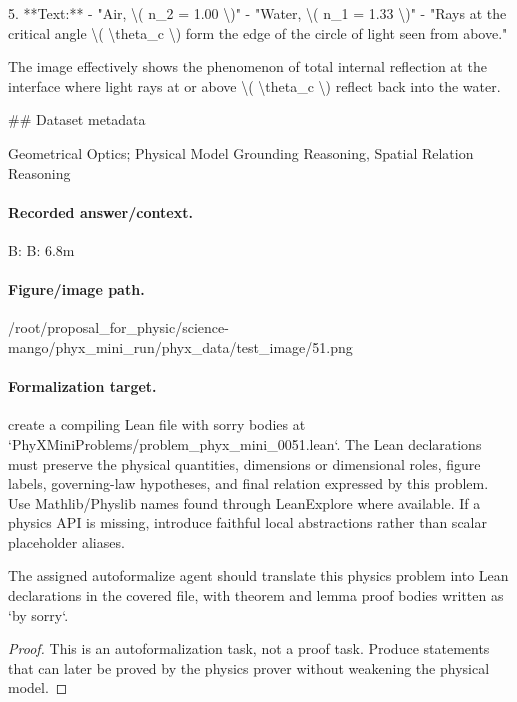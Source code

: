 5. **Text:**
   - "Air, \textbackslash{}( n\_2 = 1.00 \textbackslash{})"
   - "Water, \textbackslash{}( n\_1 = 1.33 \textbackslash{})"
   - "Rays at the critical angle \textbackslash{}( \textbackslash{}theta\_c \textbackslash{}) form the edge of the circle of light seen from above."

The image effectively shows the phenomenon of total internal reflection at the interface where light rays at or above \textbackslash{}( \textbackslash{}theta\_c \textbackslash{}) reflect back into the water.

\#\# Dataset metadata

Geometrical Optics; Physical Model Grounding Reasoning, Spatial Relation Reasoning

\paragraph{Recorded answer/context.}
B: B: 6.8m

\paragraph{Figure/image path.}
/root/proposal\_for\_physic/science-mango/phyx\_mini\_run/phyx\_data/test\_image/51.png

\paragraph{Formalization target.}
create a compiling Lean file with sorry bodies at `PhyXMiniProblems/problem\_phyx\_mini\_0051.lean`. The Lean declarations must preserve the physical quantities, dimensions or dimensional roles, figure labels, governing-law hypotheses, and final relation expressed by this problem.
Use Mathlib/Physlib names found through LeanExplore where available. If a physics API is missing, introduce faithful local abstractions rather than scalar placeholder aliases.

\begin{theorem}
\label{thm:physics:phyx_mini_0051:target}
The assigned autoformalize agent should translate this physics problem into Lean declarations in the covered file, with theorem and lemma proof bodies written as `by sorry`.
\end{theorem}
\begin{proof}
This is an autoformalization task, not a proof task. Produce statements that can later be proved by the physics prover without weakening the physical model.
\end{proof}

